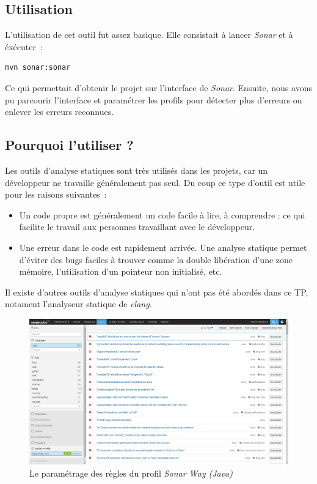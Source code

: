 \documentclass{article}
\begin{document}
\subsection{Utilisation}
L'utilisation de cet outil fut assez basique. Elle consistait à lancer \emph{Sonar} et à éxécuter~:
\begin{verbatim}
mvn sonar:sonar
\end{verbatim}
Ce qui permettait d'obtenir le projet sur l'interface de \emph{Sonar}. Ensuite, nous avons pu parcourir l'interface et paramétrer les profils pour détecter plus d'erreurs ou enlever les erreurs reconnues.
\subsection{Pourquoi l'utiliser ?}
Les outils d'analyse statiques sont très utilisés dans les projets, car un développeur ne travaille généralement pas seul. Du coup ce type d'outil est utile pour les raisons suivantes~:
\begin{itemize}
	\item Un code propre est généralement un code facile à lire, à comprendre : ce qui facilite le travail aux personnes travaillant avec le développeur.
	\item Une erreur dans le code est rapidement arrivée. Une analyse statique permet d'éviter des bugs faciles à trouver comme la double libération d'une zone mémoire, l'utilisation d'un pointeur non initialisé, etc.
\end{itemize}
Il existe d'autres outils d'analyse statiques qui n'ont pas été abordés dans ce TP, notament l'analyseur statique de \emph{clang}.
\begin{figure}
	\begin{center}
		\includegraphics[scale=0.3]{img/sonarqube}
		\caption{Le paramétrage des règles du profil \emph{Sonar Way (Java)}}
		\label{fig:Sonarqube}
	\end{center}
\end{figure}
\end{document}
